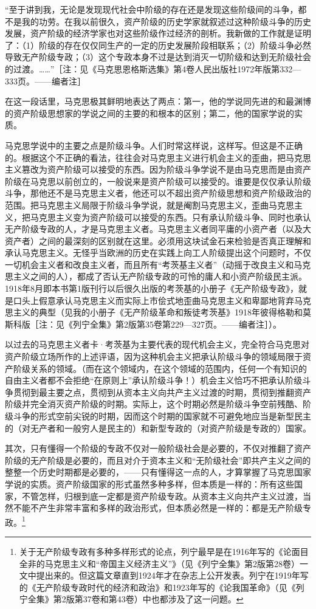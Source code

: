 \documentclass[UTF8, 12pt, a4paper]{ctexrep}
\begin{document}
“至于讲到我，无论是发现现代社会中阶级的存在还是发现这些阶级间的斗争，都不是我的功劳。在我以前很久，资产阶级的历史学家就叙述过这种阶级斗争的历史发展，资产阶级的经济学家也对这些阶级作过经济的剖析。我新做的工作就是证明了：（1）阶级的存在仅仅同生产的一定的历史发展阶段相联系；（2）阶级斗争必然导致无产阶级专政；（3）这个专政本身不过是达到消灭一切阶级和达到无阶级社会的过渡。……”［注：见《马克思恩格斯选集》第4卷人民出版社1972年版第332—333页。——编者注］

在这一段话里，马克思极其鲜明地表达了两点：第一，他的学说同先进的和最渊博的资产阶级思想家的学说之间的主要的和根本的区别；第二，他的国家学说的实质。

马克思学说中的主要之点是阶级斗争。人们时常这样说，这样写。但这是不正确的。根据这个不正确的看法，往往会对马克思主义进行机会主义的歪曲，把马克思主义篡改为资产阶级可以接受的东西。因为阶级斗争学说不是由马克思而是由资产阶级在马克思以前创立的，一般说来是资产阶级可以接受的。谁要是仅仅承认阶级斗争，那他还不是马克思主义者，他还可以不超出资产阶级思想和资产阶级政治的范围。把马克思主义局限于阶级斗争学说，就是阉割马克思主义，歪曲马克思主义，把马克思主义变为资产阶级可以接受的东西。只有承认阶级斗争、同时也承认无产阶级专政的人，才是马克思主义者。马克思主义者同平庸的小资产者（以及大资产者）之间的最深刻的区别就在这里。必须用这块试金石来检验是否真正理解和承认马克思主义。无怪乎当欧洲的历史在实践上向工人阶级提出这个问题时，不仅一切机会主义者和改良主义者，而且所有“考茨基主义者”（动摇于改良主义和马克思主义之间的人），都成了否认无产阶级专政的可怜的庸人和小资产阶级民主派。1918年8月即本书第1版刊行以后很久出版的考茨基的小册子《无产阶级专政》，就是口头上假意承认马克思主义而实际上市侩式地歪曲马克思主义和卑鄙地背弃马克思主义的典型（见我的小册子《无产阶级革命和叛徒考茨基》1918年彼得格勒和莫斯科版［注：见《列宁全集》第2版第35卷第229—327页。——编者注］）。

以过去的马克思主义者卡·考茨基为主要代表的现代机会主义，完全符合马克思对资产阶级立场所作的上述评语，因为这种机会主义把承认阶级斗争的领域局限于资产阶级关系的领域。（而在这个领域内，在这个领域的范围内，任何一个有知识的自由主义者都不会拒绝“在原则上”承认阶级斗争！）机会主义恰巧不把承认阶级斗争贯彻到最主要之点，贯彻到从资本主义向共产主义过渡的时期，贯彻到推翻资产阶级并完全消灭资产阶级的时期。实际上，这个时期必然是阶级斗争空前残酷、阶级斗争的形式空前尖锐的时期，因而这个时期的国家就不可避免地应当是新型民主的（对无产者和一般穷人是民主的）和新型专政的（对资产阶级是专政的）国家。

其次，只有懂得一个阶级的专政不仅对一般阶级社会是必要的，不仅对推翻了资产阶级的无产阶级是必要的，而且对介于资本主义和“无阶级社会”即共产主义之间的整整一个历史时期都是必要的，——只有懂得这一点的人，才算掌握了马克思国家学说的实质。资产阶级国家的形式虽然多种多样，但本质是一样的：所有这些国家，不管怎样，归根到底一定都是资产阶级专政。从资本主义向共产主义过渡，当然不能不产生非常丰富和多样的政治形式，但本质必然是一样的：都是无产阶级专政。\footnote{关于无产阶级专政有多种多样形式的论点，列宁最早是在1916年写的《论面目全非的马克思主义和“帝国主义经济主义”》（见《列宁全集》第2版第28卷）一文中提出来的。但这篇文章直到1924年才在杂志上公开发表。列宁在1919年写的《无产阶级专政时代的经济和政治》和1923年写的《论我国革命》（见《列宁全集》第2版第37卷和第43卷）中也都涉及了这一问题。}
\end{document}
